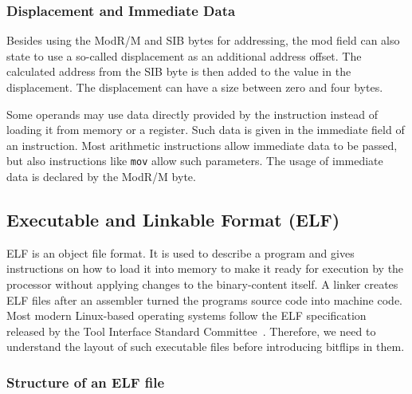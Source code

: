 \subsubsection{Displacement and Immediate Data}

Besides using the ModR/M and SIB bytes for addressing, the mod field can also
state to use a so-called displacement as an additional address offset. The
calculated address from the SIB byte is then added to the value in the
displacement. The displacement can have a size between zero and four bytes.

Some operands may use data directly provided by the instruction instead of
loading it from memory or a register. Such data is given in the immediate field
of an instruction. Most arithmetic instructions allow immediate data to be
passed, but also instructions like \texttt{mov} allow such parameters. The usage
of immediate data is declared by the ModR/M byte.

\subsection{Executable and Linkable Format (ELF)}

ELF is an object file format. It is used to describe a program and gives
instructions on how to load it into memory to make it ready for execution
by the processor without applying changes to the binary-content itself. A
linker creates ELF files after an assembler turned the program\textquotesingle s
source code into machine code. Most modern Linux-based operating systems follow
the ELF specification released by the Tool Interface Standard
Committee~\cite{elfspec}. Therefore, we need to understand the layout of such
executable files before introducing bitflips in them.

\subsubsection{Structure of an ELF file}

